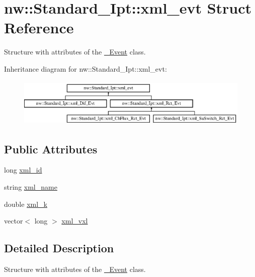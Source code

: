 \hypertarget{structnw_1_1_standard___ipt_1_1xml__evt}{\section{nw\+:\+:Standard\+\_\+\+Ipt\+:\+:xml\+\_\+evt Struct Reference}
\label{structnw_1_1_standard___ipt_1_1xml__evt}
}


Structure with attributes of the \hyperlink{classnw_1_1___event}{\+\_\+\+Event} class.  


Inheritance diagram for nw\+:\+:Standard\+\_\+\+Ipt\+:\+:xml\+\_\+evt\+:\begin{figure}[H]
\begin{center}
\leavevmode
\includegraphics[height=2.276423cm]{db/d3b/structnw_1_1_standard___ipt_1_1xml__evt}
\end{center}
\end{figure}
\subsection*{Public Attributes}
\begin{DoxyCompactItemize}
\item 
long \hyperlink{structnw_1_1_standard___ipt_1_1xml__evt_a7e6815f357b9eae3220c0f4d1f9f6dbd}{xml\+\_\+id}
\item 
string \hyperlink{structnw_1_1_standard___ipt_1_1xml__evt_a2d2a44e9bedde8ef00af81617b057cb9}{xml\+\_\+name}
\item 
double \hyperlink{structnw_1_1_standard___ipt_1_1xml__evt_af8a72fd81f09d6924703af53ad3689ee}{xml\+\_\+k}
\item 
vector$<$ long $>$ \hyperlink{structnw_1_1_standard___ipt_1_1xml__evt_aafc49103df741f710fa1eb6a806f9c24}{xml\+\_\+vxl}
\end{DoxyCompactItemize}


\subsection{Detailed Description}
Structure with attributes of the \hyperlink{classnw_1_1___event}{\+\_\+\+Event} class. 

